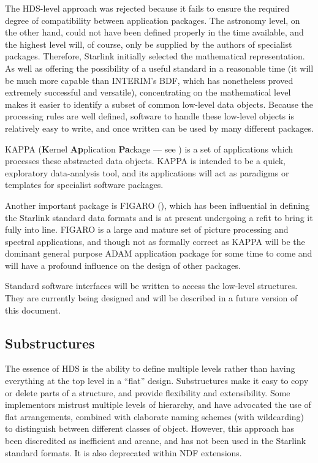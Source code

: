 \documentclass[twoside,11pt,nolof,noabs]{starlink}
\begin{document}
The HDS-level approach was rejected because it fails to ensure the
required degree of compatibility between application packages.
The astronomy level, on the other hand, could not
have been defined properly in the time available, and
the highest level will, of course,
only be supplied by the authors of specialist
packages. Therefore, Starlink initially selected the mathematical
representation. As well as offering the
possibility of a useful standard in a reasonable time (it will
be much more capable than INTERIM's BDF, which has nonetheless
proved extremely successful and versatile),
concentrating on the mathematical level
makes it easier to identify a subset of common
low-level data objects.  Because the processing rules are
well defined, software to handle
these low-level objects is relatively easy to write,
and once written can be used by many different packages.

{\small KAPPA} (\textbf{K}ernel \textbf{Ap}plication \textbf{Pa}ckage ---
see ) is a set of
applications which processes these abstracted data
objects.  {\small KAPPA} is
intended to be a quick, exploratory data-analysis tool, and its
applications will act as paradigms
or templates for specialist software packages.

Another important package is {\small FIGARO} (), which
has been influential in defining the Starlink
standard data formats and is at present undergoing a refit
to bring it fully into line.
{\small FIGARO} is a large and mature set of picture processing
and spectral
applications, and though not as formally
correct as {\small KAPPA} will be the
dominant general purpose {\small ADAM} application package for some
time to come and will have a profound influence on the
design of other packages.

Standard software interfaces will be written to access the low-level
structures.  They are currently being designed
and will be described
in a future version of this document.

\subsection*{Substructures}
The essence of HDS is the ability to define
multiple levels rather than having everything at the
top level in a ``flat'' design.
Substructures make it easy to copy or delete parts of a structure, and
provide flexibility and extensibility.  Some implementors
mistrust multiple levels of hierarchy, and have advocated
the use of flat arrangements, combined with elaborate
naming schemes (with wildcarding) to distinguish between different
classes of object.  However, this approach has been
discredited as inefficient and arcane, and has not been used
in the Starlink standard formats.  It is also deprecated
within NDF extensions.
\end{document}
